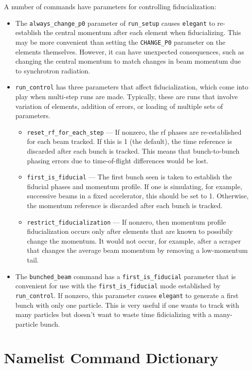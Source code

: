 \documentclass[11pt]{article}
\begin{document}
A number of commands have parameters for controlling fiducialization:
\begin{itemize}
\item The \verb|always_change_p0| parameter of \verb|run_setup| causes
	\verb|elegant| to re-establish the central momentum after each
	element when fiducializing.  This may be more convenient than
	setting the \verb|CHANGE_P0| parameter on the elements themselves.
	However, it can have unexpected consequences, such as changing the
	central momentum to match changes in beam momentum due to synchrotron
	radiation.
\item \verb|run_control| has three parameters that affect fiducialization,
	which come into play when multi-step runs are made.  Typically, these
	are runs that involve variation of elements, addition of errors,
	or loading of multiple sets of parameters.
	\begin{itemize}
	\item \verb|reset_rf_for_each_step| --- If nonzero, the rf phases are 
	re-established
	for each beam tracked.  If this is 1 (the default), 
	the time reference is discarded after each bunch is tracked.
	This means that bunch-to-bunch phasing errors due to time-of-flight 
	differences would be lost.  
	\item \verb|first_is_fiducial| --- The first bunch seen is taken to
	establish the fiducial phases and momentum profile.  If one is simulating,
	for example, successive beams in a fixed accelerator, this should be set
	to 1.  Otherwise, the momentum reference is discarded after each bunch
	is tracked.
	\item \verb|restrict_fiducialization| --- If nonzero, then momentum profile
	fiducialization occurs only after elements that are known to possibily
	change the momentum. It would not occur, for example, after a scraper that
	changes the average beam momentum by removing a low-momentum tail.
	\end{itemize}
\item The \verb|bunched_beam| command has a \verb|first_is_fiducial| parameter
	that is convenient for use with the \verb|first_is_fiducial| mode
	established by \verb|run_control|.  If nonzero, this parameter causes
	\verb|elegant| to generate a first bunch with only one particle.
	This is very useful if one wants to track with many particles but doesn't
	want to waste time fidicializing with a many-particle bunch.
\end{itemize}


\section{Namelist Command Dictionary}
\end{document}
